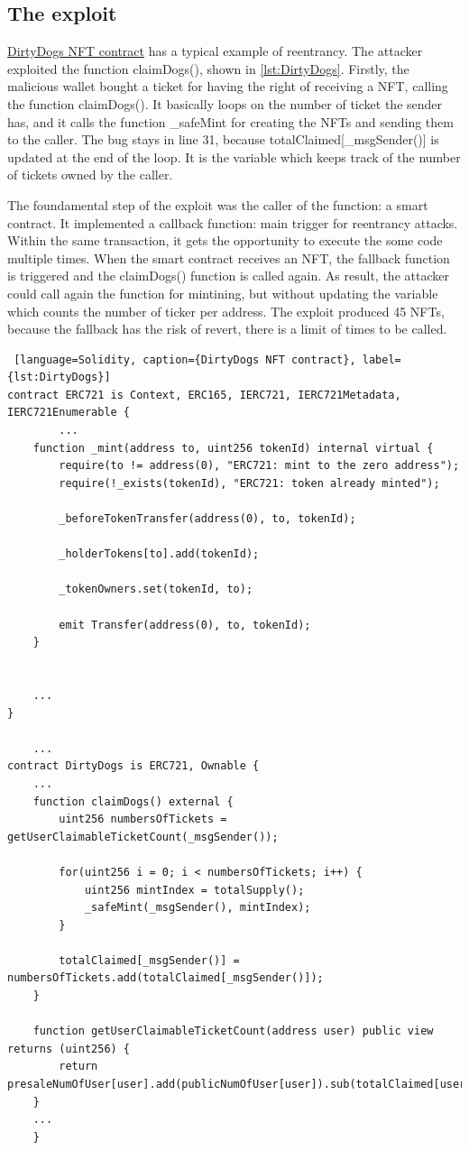 \subsection{The exploit}
\label{sec:DirtyDogs:Exploit}
\href{https://etherscan.io/address/0x540cc373acfacd250a4250d7b26e9800b71f0484#code}{DirtyDogs NFT contract} has a typical example of reentrancy.
The attacker exploited the function claimDogs(), shown in \autoref{lst:DirtyDogs}.
Firstly, the malicious wallet bought a ticket for having the right of receiving a NFT, calling the function claimDogs().
It basically loops on the number of ticket the sender has, and it calls the function \_safeMint for creating the NFTs and sending them to 
the caller.
The bug stays in line 31, because totalClaimed[\_msgSender()] is updated at the end of the loop. It is the variable which 
keeps track of the number of tickets owned by the caller.

The foundamental step of the exploit was the caller of the function: a smart contract. It implemented a 
callback function: main trigger for reentrancy attacks. 
Within the same transaction, it gets the opportunity to execute the some code multiple times. 
When the smart contract receives an NFT, the fallback function is triggered and the claimDogs() function is called again. 
As result, the attacker could call again the function for mintining, but without updating the variable which counts the number of ticker per address.
The exploit produced 45 NFTs, because the fallback has the risk of revert, 
there is a limit of times to be called.

    
\begin{lstlisting} [language=Solidity, caption={DirtyDogs NFT contract}, label={lst:DirtyDogs}]
contract ERC721 is Context, ERC165, IERC721, IERC721Metadata, IERC721Enumerable {
        ... 
    function _mint(address to, uint256 tokenId) internal virtual {
        require(to != address(0), "ERC721: mint to the zero address");
        require(!_exists(tokenId), "ERC721: token already minted");

        _beforeTokenTransfer(address(0), to, tokenId);

        _holderTokens[to].add(tokenId);

        _tokenOwners.set(tokenId, to);

        emit Transfer(address(0), to, tokenId);
    }


    ...
}
    
    ... 
contract DirtyDogs is ERC721, Ownable {
    ...
    function claimDogs() external {
        uint256 numbersOfTickets = getUserClaimableTicketCount(_msgSender());
        
        for(uint256 i = 0; i < numbersOfTickets; i++) {
            uint256 mintIndex = totalSupply();
            _safeMint(_msgSender(), mintIndex);
        }

        totalClaimed[_msgSender()] = numbersOfTickets.add(totalClaimed[_msgSender()]);
    }

    function getUserClaimableTicketCount(address user) public view returns (uint256) {
        return presaleNumOfUser[user].add(publicNumOfUser[user]).sub(totalClaimed[user]);
    }
    ...
    }
\end{lstlisting} 


